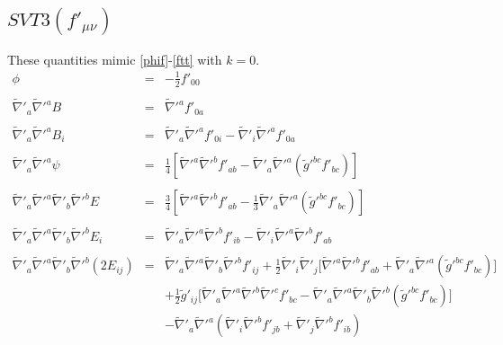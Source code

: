 \documentclass[10pt,letterpaper]{article}
\numberwithin{equation}{section}
\begin{document}
\subsection{$SVT3(f'_{\mu\nu})$}
These quantities mimic \eqref{phif}-\eqref{ftt} with $k=0$.
\begin{eqnarray}
\phi &=& -\tfrac{1}{2} f'_{00}
\label{phifp}
\\ \nonumber\\
\tilde\nabla'_a\tilde\nabla'^a B &=& \tilde\nabla'^a f'_{0a}
\\ \nonumber\\
\tilde\nabla'_a\tilde\nabla'^a B_i &=& \tilde\nabla'_a\tilde\nabla'^a f'_{0i} -\tilde\nabla'_i \tilde\nabla'^a f'_{0a}
\\ \nonumber\\
\tilde\nabla'_a\tilde\nabla'^a\psi &=& \frac{1}{4}\left[\tilde\nabla'^a\tilde\nabla'^b f'_{ab}-\tilde\nabla'_a\tilde\nabla'^a (\tilde g'^{bc}f'_{bc})\right]
\\ \nonumber\\
\tilde\nabla'_a\tilde\nabla'^a\tilde\nabla'_b\tilde\nabla'^b E &=& \frac{3}{4}\left[ \tilde\nabla'^a\tilde\nabla'^b f'_{ab} -\frac{1}{3}\tilde\nabla'_a\tilde\nabla'^a (\tilde g'^{bc}f'_{bc})\right]
\\ \nonumber\\
\tilde\nabla'_a\tilde\nabla'^a \tilde\nabla'_b\tilde\nabla'^b E_i &=&
\tilde\nabla'_a\tilde\nabla'^a \tilde\nabla'^b f'_{ib} - \tilde\nabla'_i \tilde\nabla'^a\tilde\nabla'^b f'_{ab}
\label{Ep}
\\ \nonumber\\
\tilde\nabla'_a\tilde\nabla'^a\tilde\nabla'_b\tilde\nabla'^b (2E_{ij})
&=& 
\tilde\nabla'_a\tilde\nabla'^a\tilde\nabla'_b\tilde\nabla'^bf'_{ij}
+ \tfrac12 \tilde\nabla'_i\tilde\nabla'_j\big[ \tilde\nabla'^a\tilde\nabla'^b f'_{ab} + \tilde\nabla'_a\tilde\nabla'^a (\tilde g'^{bc}f'_{bc})\big]
\nonumber\\
&&
+\tfrac12 \tilde g'_{ij} \big[ \tilde\nabla'_a\tilde\nabla'^a\tilde\nabla'^b\tilde\nabla'^c f'_{bc}-\tilde\nabla'_a\tilde\nabla'^a\tilde\nabla'_b\tilde\nabla'^b(\tilde g'^{bc}f'_{bc})\big]
\nonumber\\
&&
-\tilde\nabla'_a\tilde\nabla'^a (\tilde\nabla'_i\tilde\nabla'^b f'_{jb} + \tilde\nabla'_j \tilde\nabla'^b f'_{ib})
\label{fttp}
\end{eqnarray}

\end{document}
